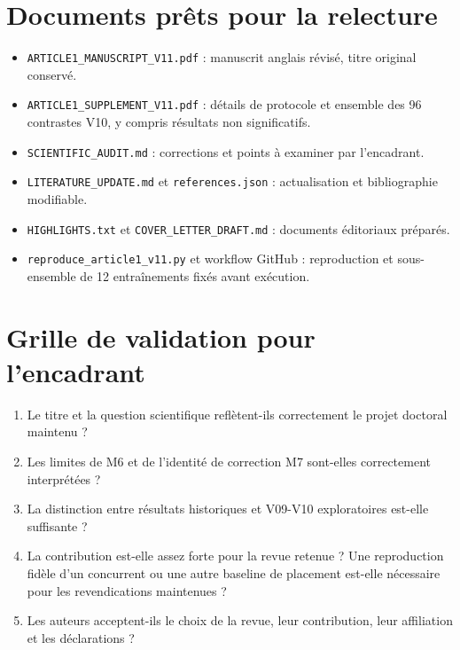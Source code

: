 \documentclass[
  11pt,
]{article}
\providecommand{\tightlist}{%
  \setlength{\itemsep}{0pt}\setlength{\parskip}{0pt}}
\begin{document}
\hypertarget{documents-pruxeats-pour-la-relecture}{%
\section{Documents prêts pour la
relecture}\label{documents-pruxeats-pour-la-relecture}}

\begin{itemize}
\tightlist
\item
  \texttt{ARTICLE1\_MANUSCRIPT\_V11.pdf} : manuscrit anglais révisé,
  titre original conservé.
\item
  \texttt{ARTICLE1\_SUPPLEMENT\_V11.pdf} : détails de protocole et
  ensemble des 96 contrastes V10, y compris résultats non significatifs.
\item
  \texttt{SCIENTIFIC\_AUDIT.md} : corrections et points à examiner par
  l'encadrant.
\item
  \texttt{LITERATURE\_UPDATE.md} et \texttt{references.json} :
  actualisation et bibliographie modifiable.
\item
  \texttt{HIGHLIGHTS.txt} et \texttt{COVER\_LETTER\_DRAFT.md} :
  documents éditoriaux préparés.
\item
  \texttt{reproduce\_article1\_v11.py} et workflow GitHub : reproduction
  et sous-ensemble de 12 entraînements fixés avant exécution.
\end{itemize}

\hypertarget{grille-de-validation-pour-lencadrant}{%
\section{Grille de validation pour
l'encadrant}\label{grille-de-validation-pour-lencadrant}}

\begin{enumerate}
\def\labelenumi{\arabic{enumi}.}
\tightlist
\item
  Le titre et la question scientifique reflètent-ils correctement le
  projet doctoral maintenu ?
\item
  Les limites de M6 et de l'identité de correction M7 sont-elles
  correctement interprétées ?
\item
  La distinction entre résultats historiques et V09-V10 exploratoires
  est-elle suffisante ?
\item
  La contribution est-elle assez forte pour la revue retenue ? Une
  reproduction fidèle d'un concurrent ou une autre baseline de placement
  est-elle nécessaire pour les revendications maintenues ?
\item
  Les auteurs acceptent-ils le choix de la revue, leur contribution,
  leur affiliation et les déclarations ?
\end{enumerate}
\end{document}
